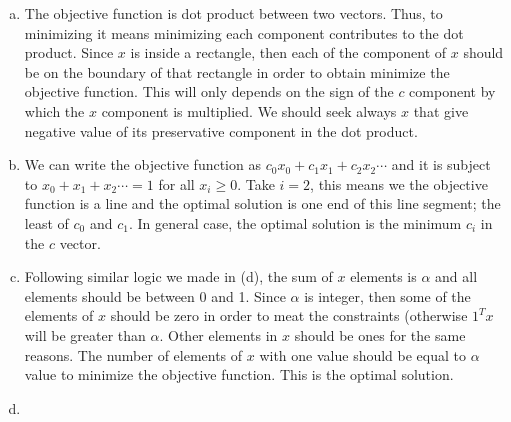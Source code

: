 \documentclass[12pt] {article}
\begin{document}
\begin{enumerate}[(a)]
\item The objective function is dot product between two vectors. Thus, to minimizing it means minimizing each component contributes to the dot product. Since $x$ is inside a rectangle, then each of the component of $x$ should be on the boundary of that rectangle in order to obtain minimize the objective function. This will only depends on the sign of the $c$ component by which the $x$ component is multiplied. We should seek always $x$ that give negative value of its preservative component in the dot product. 
\item We can write the objective function as $c_{0}x_{0}+c_{1}x_{1}+c_{2}x_{2}\cdots $ and it is subject to $x_{0}+x_{1}+x_{2} \cdots = 1$ for all $x_{i}\geq 0$. Take $i=2$, this means we the objective function is a line and the optimal solution is one end of this line segment; the least of $c_{0}$ and $c_{1}$. In general case, the optimal solution is the minimum $c_{i}$ in the $c$ vector. 
\item Following similar logic we made in (d), the sum of $x$ elements is $\alpha$ and all elements should be between 0 and 1. Since $\alpha$ is integer, then some of the elements of $x$ should be zero in order to meat the constraints (otherwise $1^{T}x$ will be greater than $\alpha$. Other elements in $x$ should be ones for the same reasons. The number of elements of $x$ with one value should be equal to $\alpha$ value to minimize the objective function. This is the optimal solution.
\item 
\end{enumerate}
\end{document}

